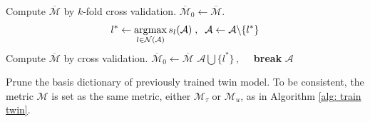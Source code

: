 \begin{algorithm}[htbp]
\begin{algorithmic}[1]
\STATE Compute $\overline{\mathcal{M}}$ by $k$-fold cross validation. 
       $\overline{\mathcal{M}}_0\leftarrow 
       \overline{\mathcal{M}}$.
    \STATE $$l^* \leftarrow \operatorname*{\arg\!\max}_{l \in \mathcal{N}(\mathcal{A})} s_l(\mathcal{A})\;,\;\;
             \mathcal{A} \leftarrow 
             \mathcal{A} \backslash \{l^*\}$$
    \STATE Compute $\overline{\mathcal{M}}$ by cross validation.
        \STATE $\overline{\mathcal{M}}_0 \leftarrow \overline{\mathcal{M}}$
    \ELSE 
        \STATE $\mathcal{A} \bigcup \{l^*\}\,,\quad$
               \textbf{break}
    \ENDIF
\ENDWHILE
\ENSURE $\mathcal{A}$
\end{algorithmic}
\caption{Prune the basis dictionary of previously trained twin model. To
       be consistent, the metric $\mathcal{M}$ 
       is set as the same 
       metric, either $\mathcal{M}_\tau$ or $\mathcal{M}_u$, as in Algorithm \ref{alg: train twin}.}
\label{alg: bayes opt twin prune}
\end{algorithm}



